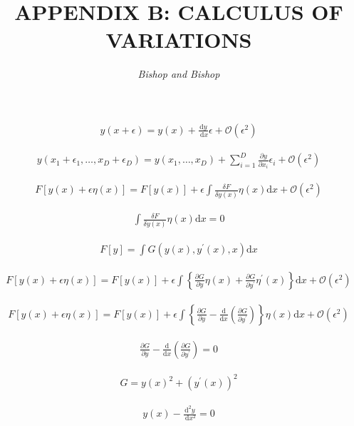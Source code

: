 \documentclass{article}
\title{\LARGE\scshape\MakeUppercase{Appendix B: Calculus of Variations}}
\author{\textit{Bishop and Bishop}}
\date{}
\begin{document}
\maketitle

\begin{align*}
y(x+\epsilon)=y(x)+\frac{\mathrm{d} y}{\mathrm{~d} x} \epsilon+\mathcal{O}\left(\epsilon^{2}\right) 
\tag{B.1}
\end{align*}

\begin{align*}
y\left(x_{1}+\epsilon_{1}, \ldots, x_{D}+\epsilon_{D}\right)=y\left(x_{1}, \ldots, x_{D}\right)+\sum_{i=1}^{D} \frac{\partial y}{\partial x_{i}} \epsilon_{i}+\mathcal{O}\left(\epsilon^{2}\right)
\tag{B.2}
\end{align*}

\begin{align*}
F[y(x)+\epsilon \eta(x)]=F[y(x)]+\epsilon \int \frac{\delta F}{\delta y(x)} \eta(x) \mathrm{d} x+\mathcal{O}\left(\epsilon^{2}\right)
\tag{B.3}
\end{align*}

\begin{align*}
\int \frac{\delta F}{\delta y(x)} \eta(x) \mathrm{d} x=0
\tag{B.4}
\end{align*}

\begin{align*}
F[y]=\int G\left(y(x), y^{\prime}(x), x\right) \mathrm{d} x
\tag{B.5}
\end{align*}

\begin{align*}
F[y(x)+\epsilon \eta(x)]=F[y(x)]+\epsilon \int\left\{\frac{\partial G}{\partial y} \eta(x)+\frac{\partial G}{\partial y^{\prime}} \eta^{\prime}(x)\right\} \mathrm{d} x+\mathcal{O}\left(\epsilon^{2}\right)
\tag{B.6}
\end{align*}

\begin{align*}
F[y(x)+\epsilon \eta(x)]=F[y(x)]+\epsilon \int\left\{\frac{\partial G}{\partial y}-\frac{\mathrm{d}}{\mathrm{d} x}\left(\frac{\partial G}{\partial y^{\prime}}\right)\right\} \eta(x) \mathrm{d} x+\mathcal{O}\left(\epsilon^{2}\right)
\tag{B.7}
\end{align*}

\begin{align*}
\frac{\partial G}{\partial y}-\frac{\mathrm{d}}{\mathrm{d} x}\left(\frac{\partial G}{\partial y^{\prime}}\right)=0
\tag{B.8}
\end{align*}

\begin{align*}
G=y(x)^{2}+\left(y^{\prime}(x)\right)^{2}
\tag{B.9}
\end{align*}

\begin{align*}
y(x)-\frac{\mathrm{d}^{2} y}{\mathrm{~d} x^{2}}=0
\tag{B.10}
\end{align*}
\end{document}
